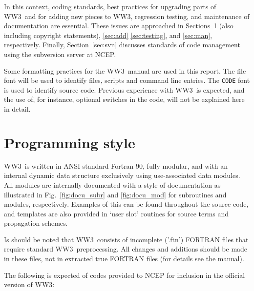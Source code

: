 \documentclass[12pt]{article}
\newcommand{\ws}{WW3}
\newcommand{\file}{\sf}
\newcommand{\code}{\tt}
\newcommand{\pb}{\strut \vfill \pagebreak}
\newcommand{\newsec}{\setcounter{equation}{0}
                      \setcounter{myfigno}{0}
                      \setcounter{mytabno}{0}}
\newcounter{myfigno}[section]
\newcounter{mytabno}[section]
\begin{document}
In this context, coding standards, best practices for upgrading parts of \ws\
and for adding new pieces to \ws, regression testing, and maintenance of
documentation are essential. These issues are approached in
Sections~\ref{sec:style} (also including copyright statements), \ref{sec:add}
\ref{sec:testing}, and \ref{sec:man}, respectively.  Finally,
Section~\ref{sec:svn} discusses standards of code management using the
subversion server at NCEP.

Some formatting practices for the \ws\ manual are used in this report. The
{\file file} font will be used to identify files, scripts and command line
entries. The {\code CODE} font is used to identify source code. Previous
experience with \ws\ is expected, and the use of, for instance, optional
switches in the code, will not be explained here in detail.


\pb
\section{Programming style} \label{sec:style}
\newsec

\ws\ is written in ANSI standard Fortran 90, fully modular, and with an
internal dynamic data structure exclusively using use-associated data modules.
All modules are internally documented with a style of documentation as
illustrated in Fig.~\ref{fig:docu_subr} and \ref{fig:docu_mod} for subroutines
and modules, respectively. Examples of this can be found throughout the source
code, and templates are also provided in `user slot' routines for source terms
and propagation schemes. 

Is should be noted that \ws\ consists of incomplete ('{\file .ftn}') FORTRAN
files that require standard \ws\ preprocessing. All changes and additions
should be made in these files, not in extracted true FORTRAN files (for
details see the manual).

The following is expected of codes provided to NCEP for inclusion in the
official version of \ws :
\end{document}
